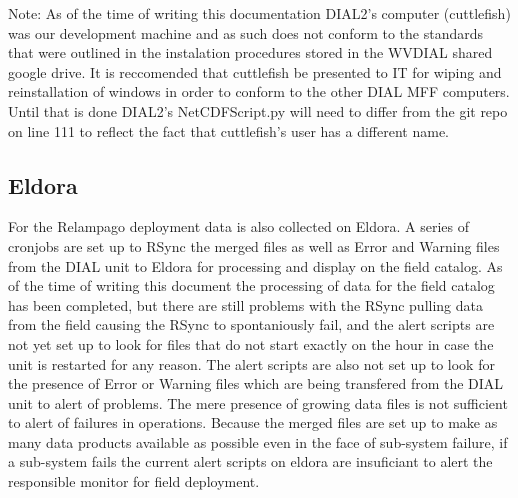 Note: As of the time of writing this documentation DIAL2's computer (cuttlefish) was our development machine and as such does not conform to the standards that were outlined in the instalation procedures stored in the WVDIAL shared google drive. It is reccomended that cuttlefish be presented to IT for wiping and reinstallation of windows in order to conform to the other DIAL MFF computers. Until that is done DIAL2's NetCDFScript.py will need to differ from the git repo on line 111 to reflect the fact that cuttlefish's user has a different name. 

\subsection{Eldora}

For the Relampago deployment data is also collected on Eldora. A series of cronjobs are set up to RSync the merged files as well as Error and Warning files from the DIAL unit to Eldora for processing and display on the field catalog. As of the time of writing this document the processing of data for the field catalog has been completed, but there are still problems with the RSync pulling data from the field causing the RSync to spontaniously fail, and the alert scripts are not yet set up to look for files that do not start exactly on the hour in case the unit is restarted for any reason. The alert scripts are also not set up to look for the presence of Error or Warning files which are being transfered from the DIAL unit to alert of problems. The mere presence of growing data files is not sufficient to alert of failures in operations. Because the merged files are set up to make as many data products available as possible even in the face of sub-system failure, if a sub-system fails the current alert scripts on eldora are insuficiant to alert the responsible monitor for field deployment. 

\newpage
